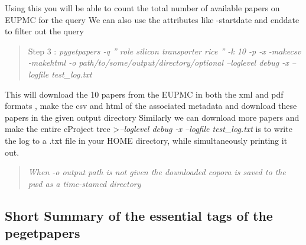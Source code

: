 \documentclass[
  letterpaper,
  DIV=11,
  numbers=noendperiod]{scrreprt}
\begin{document}
Using this you will be able to count the total number of available
papers on EUPMC for the query We can also use the attributes like
-startdate and enddate to filter out the query

\begin{quote}
Step 3 : \emph{pygetpapers -q '' role silicon transporter rice '' -k 10
-p -x -makecsv -makehtml -o path/to/some/output/directory/optional
--loglevel debug -x --logfile test\_log.txt}
\end{quote}

This will download the 10 papers from the EUPMC in both the xml and pdf
formats , make the csv and html of the associated metadata and download
these papers in the given output directory Similarly we can download
more papers and make the entire cProject tree
\textgreater{}\emph{--loglevel debug -x --logfile test\_log.txt} is to
write the log to a .txt file in your HOME directory, while
simultaneously printing it out.

\begin{quote}
\emph{When -o output path is not given the downloaded copora is saved to
the pwd as a time-stamed directory}
\end{quote}

\subsection{\texorpdfstring{\textbf{Short Summary of the essential tags
of the
pegetpapers}}{Short Summary of the essential tags of the pegetpapers}}\label{short-summary-of-the-essential-tags-of-the-pegetpapers}
\end{document}

